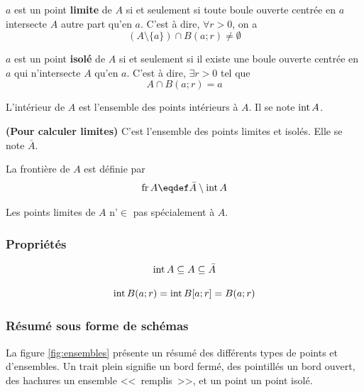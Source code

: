 \begin{mydef} 
	$a$ est un point \textbf{limite} de $A$ si et seulement si toute boule ouverte centrée en $a$ intersecte $A$ autre part qu'en $a$.
	C'est à dire, $\forall r > 0$, on a
	\[ (A \setminus \{a\}) \cap B(a; r) \neq \emptyset \]
\end{mydef}

\begin{mydef} 
	$a$ est un point \textbf{isolé} de $A$ si et seulement si il existe une boule ouverte centrée en $a$ qui n'intersecte $A$ qu'en $a$.
	C'est à dire, $\exists r > 0$ tel que
	\[ A \cap B(a; r) = a \]
\end{mydef}

\begin{mydef}[Intérieur]
	L'intérieur de $A$ est l'ensemble des points intérieurs à $A$.
	Il se note $\operatorname{int} A$.
\end{mydef}

\begin{mydef} [Fermeture]
	\textbf{(Pour calculer limites)} C'est l'ensemble des points limites et isolés.
	Elle se note $\bar{A}$.
\end{mydef}

\begin{mydef} [Frontière] La frontière de $A$ est définie par
	\[ \newfr A \eqdef \bar{A} \setminus \newint A \]
\end{mydef}

\begin{myrem}
	Les points limites de $A$ n'$\in$ pas spécialement à $A$.
\end{myrem}

\subsubsection{Propriétés}

\begin{myprop}
	\[ \operatorname{int} A \subseteq A \subseteq \bar{A} \]
\end{myprop}

\begin{myprop}
	\[ \operatorname{int} B(a; r) = \operatorname{int} B[a; r] = B(a; r) \]
\end{myprop}

\subsubsection{Résumé sous forme de schémas}

La figure \ref{fig:ensembles} présente un résumé des différents types de points et d'ensembles. Un trait plein signifie un bord fermé, des pointillés un bord ouvert, des hachures un ensemble <<~remplis~>>, et un point un point isolé.

